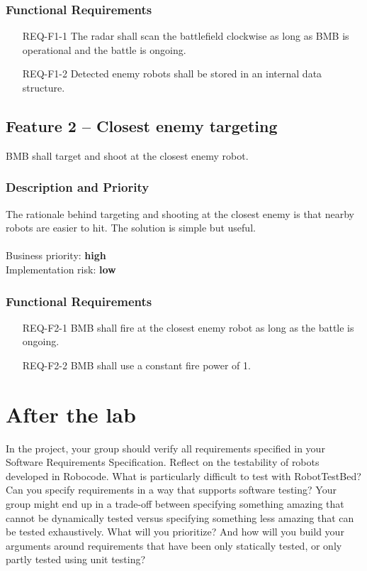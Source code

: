 \documentclass{scrreprt}
\begin{document}
\subsection{Functional Requirements}
\begin{itemize}
\item[REQ-F1-1] The radar shall scan the battlefield clockwise as long as BMB is operational and the battle is ongoing.
\item[REQ-F1-2] Detected enemy robots shall be stored in an internal data structure. 
\end{itemize}

\section{Feature 2 -- Closest enemy targeting}
BMB shall target and shoot at the closest enemy robot.

\subsection{Description and Priority}
The rationale behind targeting and shooting at the closest enemy is that nearby robots are easier to hit. The solution is simple but useful.\\\\Business priority: \textbf{high}\\
Implementation risk: \textbf{low}

\subsection{Functional Requirements}
\begin{itemize}
\item[REQ-F2-1] BMB shall fire at the closest enemy robot as long as the battle is ongoing.
\item[REQ-F2-2] BMB shall use a constant fire power of 1.
\end{itemize}

\chapter{After the lab}
In the project, your group should verify all requirements specified in your Software Requirements Specification. Reflect on the testability of robots developed in Robocode. What is particularly difficult to test with RobotTestBed? Can you specify requirements in a way that supports software testing? Your group might end up in a trade-off between specifying something amazing that cannot be dynamically  tested versus specifying something less amazing that can be tested exhaustively. What will you prioritize? And how will you build your arguments around requirements that have been only statically tested, or only partly tested using unit testing?
\end{document}
